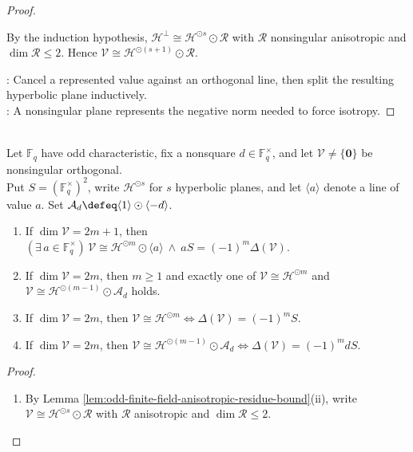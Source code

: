 \begin{lemma}
\begin{proof}
\begin{enumerate}[label=(\roman*)]
By the induction hypothesis, $\mathcal{H}^{\perp}\cong\mathcal{H}^{\odot s}\odot\mathcal{R}$ with $\mathcal{R}$ nonsingular anisotropic and $\dim\mathcal{R}\leq2$. Hence $\mathcal{V}\cong\mathcal{H}^{\odot(s+1)}\odot\mathcal{R}$.
\end{enumerate}
: Cancel a represented value against an orthogonal line, then split the resulting hyperbolic plane inductively.\\
: A nonsingular plane represents the negative norm needed to force isotropy.
\end{proof}
\end{lemma}

\begin{theorem} \label{thm:odd-finite-field-witt-decomposition} \\
Let $\mathbb{F}_q$ have odd characteristic, fix a nonsquare $d\in\mathbb{F}_q^{\times}$, and let $\mathcal{V}\neq\{\mathbf{0}\}$ be nonsingular orthogonal.\\
Put $S=(\mathbb{F}_q^{\times})^2$, write $\mathcal{H}^{\odot s}$ for $s$ hyperbolic planes, and let $\langle a\rangle$ denote a line of value $a$. Set $\mathcal{A}_d\defeq\langle1\rangle\odot\langle-d\rangle$.
\begin{enumerate}[label=(\roman*)]
\setlength{\itemsep}{0pt}
\item If $\dim\mathcal{V}=2m+1$, then $(\exists\,a\in\mathbb{F}_q^{\times})\,\mathcal{V}\cong\mathcal{H}^{\odot m}\odot\langle a\rangle\ \wedge\ aS=(-1)^m\Delta(\mathcal{V})$.
\item If $\dim\mathcal{V}=2m$, then $m\geq1$ and exactly one of $\mathcal{V}\cong\mathcal{H}^{\odot m}$ and $\mathcal{V}\cong\mathcal{H}^{\odot(m-1)}\odot\mathcal{A}_d$ holds.
\item If $\dim\mathcal{V}=2m$, then $\mathcal{V}\cong\mathcal{H}^{\odot m}\Longleftrightarrow\Delta(\mathcal{V})=(-1)^mS$.
\item If $\dim\mathcal{V}=2m$, then $\mathcal{V}\cong\mathcal{H}^{\odot(m-1)}\odot\mathcal{A}_d\Longleftrightarrow\Delta(\mathcal{V})=(-1)^mdS$.
\end{enumerate}
\begin{proof}
\begin{enumerate}[label=(\roman*)]
\setlength{\itemsep}{0pt}
\item[$(i)$] By Lemma \ref{lem:odd-finite-field-anisotropic-residue-bound}(ii), write $\mathcal{V}\cong\mathcal{H}^{\odot s}\odot\mathcal{R}$ with $\mathcal{R}$ anisotropic and $\dim\mathcal{R}\leq2$.\\

\end{enumerate}
\end{proof}
\end{theorem}

